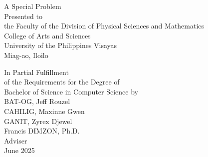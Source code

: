 \begin{titlepage}
\centering


\vspace{0.875cm}
A Special Problem\\
Presented to\\
the Faculty of the Division of Physical Sciences and Mathematics\\
College of Arts and Sciences\\
University of the Philippines Visayas\\
Miag-ao, Iloilo

\vspace{0.875cm}
In Partial Fulfillment\\
of the Requirements for the Degree of\\
Bachelor of Science in Computer Science
\vspace{1.75cm}
by\\

\vspace{0.1cm}
BAT-OG, Jeff Rouzel  \\
CAHILIG, Maxinne Gwen  \\
GANIT, Zyrex Djewel  \\

\vspace{0.875cm}
Francis DIMZON, Ph.D. \\
Adviser\\


\vspace{0.875cm}
June 2025
\end{titlepage}
